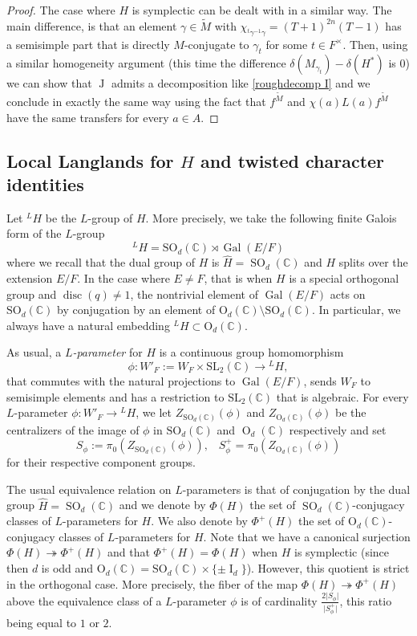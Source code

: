 \documentclass[12pt]{article}
\numberwithin{equation}{section}
\def\tM{\widetilde{M}}
\def\bC{\mathbb{C}}
\DeclareMathOperator{\Gal}{Gal}
\DeclareMathOperator{\disc}{disc}
\DeclareMathOperator{\SO}{\mathrm{SO}}
\DeclareMathOperator{\rO}{\mathrm{O}}
\DeclareMathOperator{\rI}{\mathrm{I}}
\DeclareMathOperator{\rJ}{\mathrm{J}}
\begin{document}
\begin{proof}
		
		The case where $H$ is symplectic can be dealt with in a similar way. The main difference, is that an element $\gamma\in \tM$ with $\chi_{{}^t\gamma^{-1}\gamma}=(T+1)^{2n}(T-1)$ has a semisimple part that is directly $M$-conjugate to $\gamma_t$ for some $t\in F^{\times}$. Then, using a similar homogeneity argument (this time the difference $\delta(M_{\gamma_t})-\delta(H^*)$ is $0$) we can show that $\rJ$ admits a decomposition like \eqref{roughdecomp I} and we conclude in exactly the same way using the fact that $f^{\tM}$ and $\chi(a)L(a)f^{\tM}$ have the same transfers for every $a\in A$.
	\end{proof}
	
	\subsection{Local Langlands for $H$ and twisted character identities}
	
	Let ${}^L H$ be the $L$-group of $H$. More precisely, we take the following finite Galois form of the $L$-group 
	$$\displaystyle {}^L H=\mathrm{SO}_d(\bC)\rtimes \Gal(E/F)$$
	where we recall that the dual group of $H$ is $\widehat{H}=\SO_d(\bC)$ and $H$ splits over the extension $E/F$. In the case where $E\neq F$, that is when $H$ is a special orthogonal group and $\disc(q)\neq 1$, the nontrivial element of $\Gal(E/F)$ acts on $\mathrm{SO}_d(\bC)$ by conjugation by an element of $\mathrm{O}_d(\bC)\setminus \mathrm{SO}_d(\bC)$. In particular, we always have a natural embedding ${}^L H\subset \mathrm{O}_d(\bC)$.
	
	As usual, a {\em $L$-parameter} for $H$ is a continuous group homomorphism
	$$\phi: W'_F:=W_F\times \mathrm{SL}_2(\bC)\to {}^L H,$$
	that commutes with the natural projections to $\Gal(E/F)$, sends $W_F$ to semisimple elements and has a restriction to $\mathrm{SL}_2(\bC)$ that is algebraic. For every $L$-parameter $\phi: W'_F\to {}^L H$, we let $Z_{\mathrm{SO}_d(\bC)}(\phi)$ and $Z_{\mathrm{O}_d(\bC)}(\phi)$ be the centralizers of the image of $\phi$ in $\mathrm{SO}_d(\bC)$ and $\rO_d(\bC)$ respectively and set
	$$\displaystyle S_\phi:= \pi_0(Z_{\mathrm{SO}_d(\bC)}(\phi)),\;\;\; S_\phi^+=\pi_0(Z_{\mathrm{O}_d(\bC)}(\phi))$$
	for their respective component groups.
	
	The usual equivalence relation on $L$-parameters is that of conjugation by the dual group $\widehat{H}=\SO_d(\bC)$ and we denote by $\Phi(H)$ the set of $\SO_d(\bC)$-conjugacy classes of $L$-parameters for $H$. We also denote by $\Phi^+(H)$ the set of $\mathrm{O}_d(\bC)$-conjugacy classes of $L$-parameters for $H$. Note that we have a canonical surjection $\Phi(H)\twoheadrightarrow \Phi^+(H)$ and that $\Phi^+(H)=\Phi(H)$ when $H$ is symplectic (since then $d$ is odd and $\mathrm{O}_d(\bC)=\mathrm{SO}_d(\bC)\times \{ \pm \rI_d\}$). However, this quotient is strict in the orthogonal case. More precisely, the fiber of the map $\Phi(H)\twoheadrightarrow \Phi^+(H)$ above the equivalence class of a $L$-parameter $\phi$ is of cardinality $\frac{2\lvert S_\phi\rvert}{\lvert S_\phi^+\rvert}$, this ratio being equal to $1$ or $2$.
	
\end{document}
